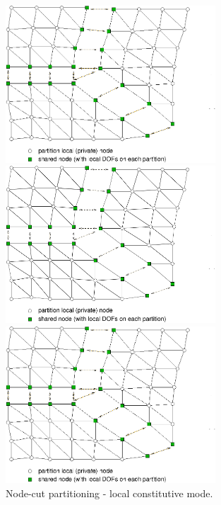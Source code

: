 \documentclass[a4paper]{article}
\begin{document}
\begin{figure}[htb]
\begin{htmlonly}
  \centerline{\includegraphics[width=0.7\textwidth]{nodecut1cb.eps}}
\end{htmlonly}
\ifpdf
\centerline{\includegraphics[width=0.7\textwidth]{nodecut1cb.pdf}}
\else
\centerline{\includegraphics[width=0.7\textwidth]{nodecut1cb.eps}}
\fi
\caption{Node-cut partitioning - local constitutive mode.}
\label{nodecut-lm}
\end{figure}
\end{document}
